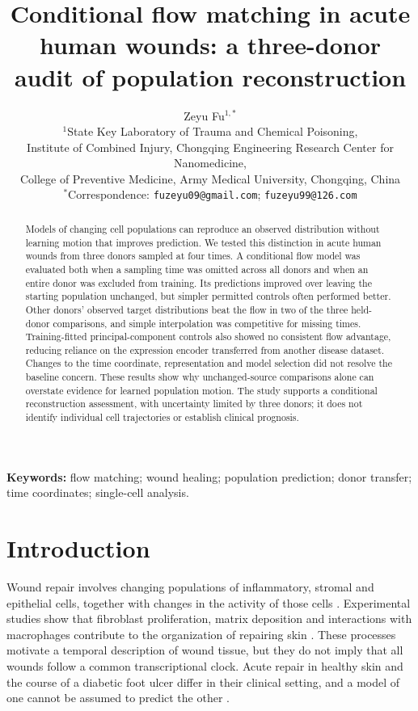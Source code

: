 \documentclass[10pt,a4paper]{article}
\title{Conditional flow matching in acute human wounds: a three-donor audit of population reconstruction}
\author{Zeyu Fu$^{1,*}$\\[3pt]\small $^1$State Key Laboratory of Trauma and Chemical Poisoning,\\\small Institute of Combined Injury, Chongqing Engineering Research Center for Nanomedicine,\\\small College of Preventive Medicine, Army Medical University, Chongqing, China\\\small $^*$Correspondence: \texttt{fuzeyu09@gmail.com}; \texttt{fuzeyu99@126.com}}\date{}
\begin{document}
\maketitle
\modulolinenumbers[5]\linenumbers
\begin{abstract}
Models of changing cell populations can reproduce an observed distribution without learning motion that improves prediction. We tested this distinction in acute human wounds from three donors sampled at four times. A conditional flow model was evaluated both when a sampling time was omitted across all donors and when an entire donor was excluded from training. Its predictions improved over leaving the starting population unchanged, but simpler permitted controls often performed better. Other donors' observed target distributions beat the flow in two of the three held-donor comparisons, and simple interpolation was competitive for missing times. Training-fitted principal-component controls also showed no consistent flow advantage, reducing reliance on the expression encoder transferred from another disease dataset. Changes to the time coordinate, representation and model selection did not resolve the baseline concern. These results show why unchanged-source comparisons alone can overstate evidence for learned population motion. The study supports a conditional reconstruction assessment, with uncertainty limited by three donors; it does not identify individual cell trajectories or establish clinical prognosis.
\end{abstract}
\noindent\textbf{Keywords:} flow matching; wound healing; population prediction; donor transfer; time coordinates; single-cell analysis.

\section{Introduction}
Wound repair involves changing populations of inflammatory, stromal and epithelial cells, together with changes in the activity of those cells \citep{wilkinson2020}. Experimental studies show that fibroblast proliferation, matrix deposition and interactions with macrophages contribute to the organization of repairing skin \citep{rognoni2018,shook2018}. These processes motivate a temporal description of wound tissue, but they do not imply that all wounds follow a common transcriptional clock. Acute repair in healthy skin and the course of a diabetic foot ulcer differ in their clinical setting, and a model of one cannot be assumed to predict the other \citep{armstrong2017}.
\end{document}
